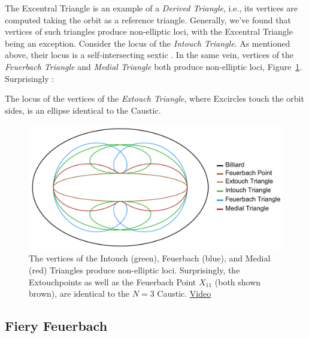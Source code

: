 The Excentral Triangle is an example of a {\em Derived Triangle}, i.e., its vertices are computed taking the orbit as a reference triangle. Generally, we've found that vertices of such triangles produce non-elliptic loci, with the Excentral Triangle being an exception. Consider the locus of the {\em Intouch Triangle}.
As mentioned above, their locus is a self-intersecting sextic \cite[pl\#2]{dsr_math_intell_playlist}. In the same vein, vertices of the {\em Feuerbach Triangle}
and {\em Medial Triangle}
both produce non-elliptic loci, Figure~\ref{fig:non-elliptic}. Surprisingly \cite{ronaldo19a}:

\begin{theorem}
The locus of the vertices of the {\em Extouch Triangle}, where Excircles touch the orbit sides, is an ellipse identical to the Caustic.
\label{thm:extouch}
\end{theorem}

\begin{figure}[H]
    \centering
    \includegraphics[height=.4\linewidth]{pics/u0040_non_elliptic.pdf}
    \caption{The vertices of the Intouch (green), Feuerbach (blue), and Medial (red) Triangles produce non-elliptic loci. Surprisingly, the Extouchpoints as well as the Feuerbach Point $X_{11}$ (both shown brown), are identical to the $N=3$ Caustic.
    \href{https://youtu.be/OGvCQbYqJyI}{Video} \cite[pl\#9]{dsr_math_intell_playlist}}
    \label{fig:non-elliptic}
\end{figure}

\subsection{Fiery Feuerbach}

